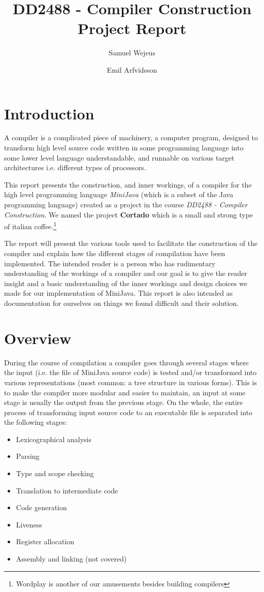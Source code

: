 \documentclass[11pt]{amsart}
\title{DD2488 - Compiler Construction\\Project Report}
\author{Samuel Wejeus \and Emil Arfvidsson}
\begin{document}
\maketitle

\section{Introduction}
A compiler is a complicated piece of machinery, a computer program, designed to transform high level source code written in some programming language into some lower level language understandable, and runnable on various target architectures i.e. different types of processors.

This report presents the construction, and inner workings, of a compiler for the high level programming language \textit{MiniJava} (which is a subset of the Java programming language) created as a project in the course \textit{DD2488 - Compiler Construction}\cite{appel}. We named the project \textbf{Cortado} which is a small and strong type of italian coffee.\footnote{Wordplay is another of our amusements besides building compilers}

The report will present the various tools used to facilitate the construction of the compiler and explain how the different stages of compilation have been implemented. The intended reader is a person who has rudimentary understanding of the workings of a compiler and our goal is to give the reader insight and a basic understanding of the inner workings and design choices we made for our implementation of MiniJava. This report is also intended as documentation for ourselves on things we found difficult and their solution.

\section{Overview}
During the course of compilation a compiler goes through several stages where the input (i.e. the file of MiniJava source code) is tested and/or transformed into various representations (most common: a tree structure in various forms). This is to make the compiler more modular and easier to maintain, an input at some stage is usually the output from the previous stage. On the whole, the entire process of transforming input source code to an executable file is separated into the following stages:

\begin{itemize}
\item Lexicographical analysis
\item Parsing
\item Type and scope checking
\item Translation to intermediate code
\item Code generation
\item{Liveness}
\item{Register allocation}
\item Assembly and linking (not covered)
\end{itemize}
\end{document}
